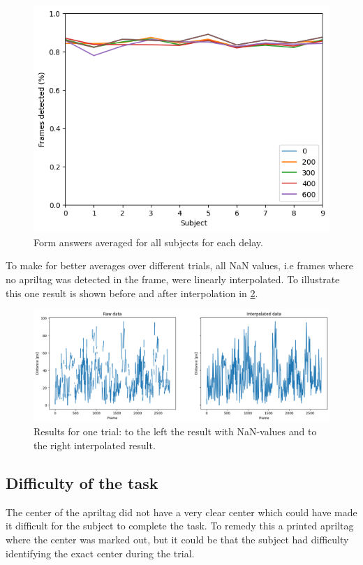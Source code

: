 \documentclass[nofilelist]{cslthse-msc}
\begin{document}
\begin{figure}[!hbt]
   \centering
   \includegraphics[scale=0.5]{images/frames-detected.png} 
   \caption{Form answers averaged for all subjects for each delay.}
   \label{fig:frames-detected}
\end{figure}

To make for better averages over different trials, all NaN values, i.e frames where no apriltag was detected in the frame, were linearly interpolated. To illustrate this one result is shown before and after interpolation in \ref{fig:raw-vs-interpolated}. 

\begin{figure}[!hbt]
   \centering
   \includegraphics[scale=0.5]{images/raw-vs-interpolated.png} 
   \caption{Results for one trial: to the left the result with NaN-values and to the right interpolated result.}
   \label{fig:raw-vs-interpolated}
\end{figure}

\subsection{Difficulty of the task}
The center of the apriltag did not have a very clear center which could have made it difficult for the subject to complete the task. To remedy this a printed apriltag where the center was marked out, but it could be that the subject had difficulty identifying the exact center during the trial. 
\end{document}
